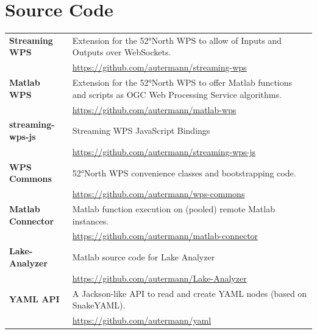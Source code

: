 \section{Source Code}

	\begin{tabularx}{\textwidth}{@{}lX@{}}
		\toprule

		\textbf{Streaming WPS}
		& Extension for the 52°North WPS to allow of Inputs and Outputs over WebSockets.\\
		& \url{https://github.com/autermann/streaming-wps} \\
		\cmidrule(r){1-1}
		\cmidrule(l){2-2}

		\textbf{Matlab WPS}
		& Extension for the 52°North WPS to offer Matlab functions and scripts as OGC Web Processing Service algorithms.\\
		& \url{https://github.com/autermann/matlab-wps}\\
		\cmidrule(r){1-1}
		\cmidrule(l){2-2}

		\textbf{streaming-wps-js}
		& Streaming WPS JavaScript Bindings\\
		& \url{https://github.com/autermann/streaming-wps-js}\\
		\cmidrule(r){1-1}
		\cmidrule(l){2-2}

		\textbf{WPS Commons}
		& 52°North WPS convenience classes and bootstrapping code.\\
		& \url{https://github.com/autermann/wps-commons}\\
		\cmidrule(r){1-1}
		\cmidrule(l){2-2}

		\textbf{Matlab Connector}
		& Matlab function execution on (pooled) remote Matlab instances.\\
		& \url{https://github.com/autermann/matlab-connector}\\
		\cmidrule(r){1-1}
		\cmidrule(l){2-2}

		\textbf{Lake-Analyzer}
		& Matlab source code for Lake Analyzer\\
		& \url{https://github.com/autermann/Lake-Analyzer}\\
		\cmidrule(r){1-1}
		\cmidrule(l){2-2}

		\textbf{YAML API}
		& A Jackson-like API to read and create YAML nodes (based on SnakeYAML).\\
		& \url{https://github.com/autermann/yaml}\\
		\bottomrule
	\end{tabularx}

